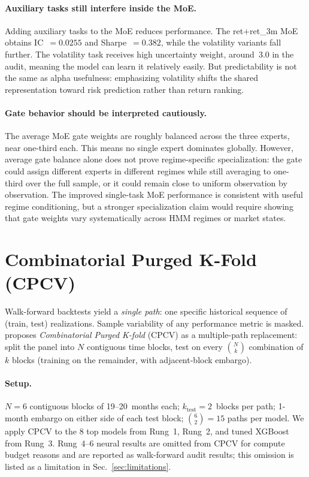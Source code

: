 \documentclass[11pt]{article}
\begin{document}
\paragraph{Auxiliary tasks still interfere inside the MoE.}
Adding auxiliary tasks to the MoE reduces performance. The ret$+$ret\_3m
MoE obtains IC~$=0.0255$ and Sharpe~$=0.382$, while the volatility
variants fall further. The volatility task receives high uncertainty
weight, around~3.0 in the audit, meaning the model can learn it
relatively easily. But predictability is not the same as alpha
usefulness: emphasizing volatility shifts the shared representation
toward risk prediction rather than return ranking.

\paragraph{Gate behavior should be interpreted cautiously.}
The average MoE gate weights are roughly balanced across the three
experts, near one-third each. This means no single expert dominates
globally. However, average gate balance alone does not prove
regime-specific specialization: the gate could assign different experts
in different regimes while still averaging to one-third over the full
sample, or it could remain close to uniform observation by observation.
The improved single-task MoE performance is consistent with useful
regime conditioning, but a stronger specialization claim would require
showing that gate weights vary systematically across HMM regimes or
market states.

\section{Combinatorial Purged K-Fold (CPCV)}\label{sec:cpcv}

Walk-forward backtests yield a \emph{single path}: one specific
historical sequence of (train, test) realizations. Sample variability
of any performance metric is masked. \citet{lopezdeprado_finml}
proposes \emph{Combinatorial Purged K-fold} (CPCV) as a multiple-path
replacement: split the panel into $N$ contiguous time blocks, test on
every $\binom{N}{k}$ combination of $k$ blocks (training on the
remainder, with adjacent-block embargo).

\paragraph{Setup.}
$N{=}6$ contiguous blocks of 19--20~months each;
$k_{\text{test}}{=}2$~blocks per path; 1-month embargo on either side
of each test block; $\binom{6}{2}{=}15$ paths per model. We apply CPCV
to the 8 top models from Rung~1, Rung~2, and tuned XGBoost from
Rung~3. Rung~4--6 neural results are omitted from CPCV for compute
budget reasons and are reported as walk-forward audit results; this
omission is listed as a limitation in Sec.~\ref{sec:limitations}.
\end{document}
